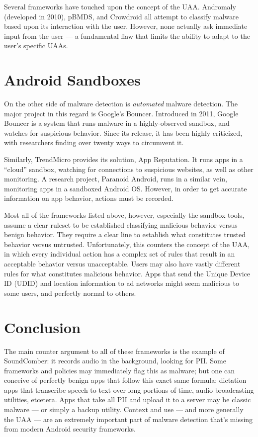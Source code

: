 Several frameworks have touched upon the concept of the UAA. Andromaly\citep{shabtai2012andromaly} (developed in 2010), pBMDS\citep{xie2010pbmds}, and Crowdroid\citep{burguera2011crowdroid} all attempt to classify malware based upon its interaction with the user. However, none actually ask immediate input from the user --- a fundamental flaw that limits the ability to adapt to the user's specific UAAs.

\section{Android Sandboxes}
On the other side of malware detection is \textit{automated} malware detection. The major project in this regard is Google's Bouncer\citep{googlebouncer}. Introduced in 2011, Google Bouncer is a system that runs malware in a highly-observed sandbox, and watches for suspicious behavior. Since its release, it has been highly criticized\citep{mansfield2012android}, with researchers finding over twenty ways to circumvent it.

Similarly, TrendMicro provides its solution, App Reputation\citep{trendmicroappreputation}. It runs apps in a ``cloud'' sandbox, watching for connections to suspicious websites, as well as other monitoring. A research project, Paranoid Android\citep{portokalidis2010paranoid}, runs in a similar vein, monitoring apps in a sandboxed Android OS. However, in order to get accurate information on app behavior, actions must be recorded.

Most all of the frameworks listed above, however, especially the sandbox tools, assume a clear ruleset to be established classifying malicious behavior versus benign behavior. They require a clear line to establish what constitutes trusted behavior versus untrusted. Unfortunately, this counters the concept of the UAA, in which every individual action has a complex set of rules that result in an acceptable behavior versus unacceptable. Users may also have vastly different rules for what constitutes malicious behavior. Apps that send the Unique Device ID (UDID) and location information to ad networks might seem malicious to some users, and perfectly normal to others.


\section{Conclusion}
The main counter argument to all of these frameworks is the example of SoundComber: it records audio in the background, looking for PII. Some frameworks and policies may immediately flag this as malware; but one can conceive of perfectly benign apps that follow this exact same formula: dictation apps that transcribe speech to text over long portions of time, audio broadcasting utilities, etcetera. Apps that take all PII and upload it to a server may be classic malware --- or simply a backup utility. Context and use --- and more generally the UAA --- are an extremely important part of malware detection that's missing from modern Android security frameworks.
